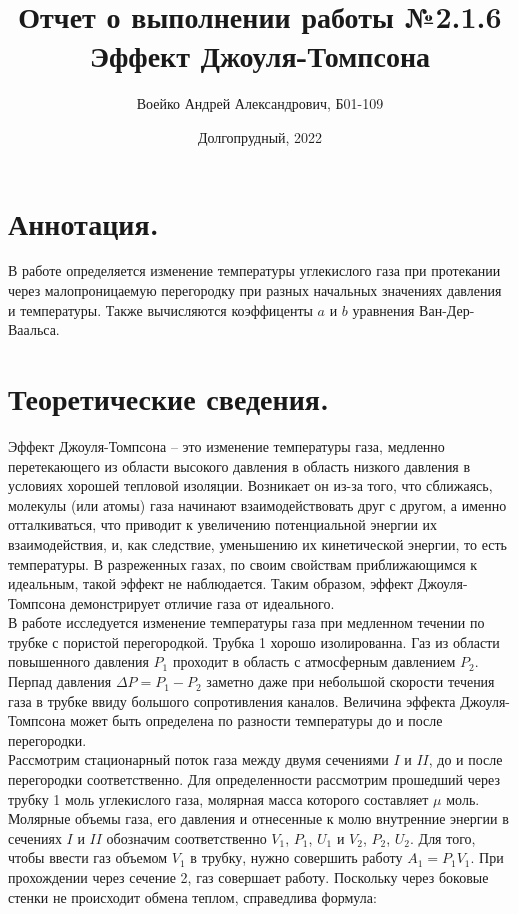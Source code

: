 \documentclass[a4paper,11pt]{article}
\title{Отчет о выполнении работы №2.1.6\\Эффект Джоуля-Томпсона}
\author{Воейко Андрей Александрович, Б01-109}
\date{Долгопрудный, 2022}
\begin{document}
\maketitle
\newpage
\section{Аннотация.}
В работе определяется изменение температуры углекислого газа при протекании через малопроницаемую перегородку при разных начальных значениях давления и температуры. Также вычисляются коэффиценты $a$ и $b$ уравнения Ван-Дер-Ваальса.
\section{Теоретические сведения.}
Эффект Джоуля-Томпсона -- это изменение температуры газа, медленно перетекающего из области высокого давления в область низкого давления в условиях хорошей тепловой изоляции. Возникает он из-за того, что сближаясь, молекулы (или атомы) газа начинают взаимодействовать друг с другом, а именно отталкиваться, что приводит к увеличению потенциальной энергии их взаимодействия, и, как следствие, уменьшению их кинетической энергии, то есть температуры. В разреженных газах, по своим свойствам приближающимся к идеальным, такой эффект не наблюдается. Таким образом, эффект Джоуля-Томпсона демонстрирует отличие газа от идеального.\\
В работе исследуется изменение температуры газа при медленном течении по трубке с пористой перегородкой. Трубка 1 хорошо изолированна. Газ из области повышенного давления $P_{1}$ проходит в область с атмосферным давлением $P_{2}$. Перпад давления $\Delta P = P_{1} - P_{2}$ заметно даже при небольшой скорости течения газа в трубке ввиду большого сопротивления каналов. Величина эффекта Джоуля-Томпсона может быть определена по разности температуры до и после перегородки.\\
Рассмотрим стационарный поток газа между двумя сечениями $I$ и $II$, до и после перегородки соответственно. Для определенности рассмотрим прошедший через трубку 1 моль углекислого газа, молярная масса которого составляет $\mu$ моль. Молярные объемы газа, его давления и отнесенные к молю внутренние энергии в сечениях $I$ и $II$ обозначим соответственно $V_{1}$, $P_{1}$, $U_{1}$ и $V_{2}$, $P_{2}$, $U_{2}$. Для того, чтобы ввести газ объемом $V_{1}$ в трубку, нужно совершить работу $A_{1} = P_{1} V_{1}$. При прохождении через сечение 2, газ совершает работу. Поскольку через боковые стенки не происходит обмена теплом, справедлива формула:\\
\end{document}

